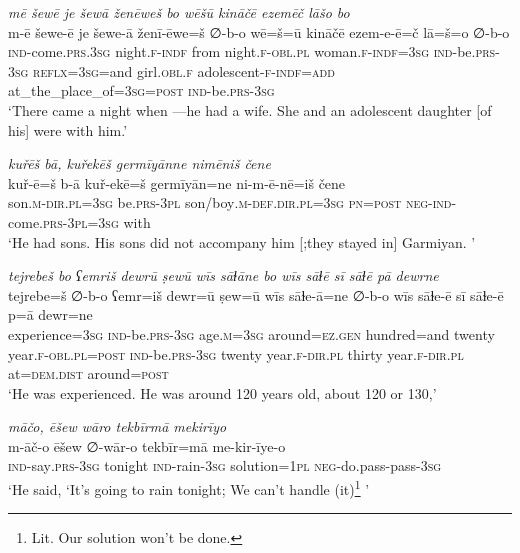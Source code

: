 \ea \label{ZB.8}
\textit{mē šewē je šewā ženēweš bo wēšū kināčē ezemēč lāšo bo} \\ 
\gll m-ē šewe-ē je šewe-ā ženī-ēwe=š ∅-b-o wē=š=ū kināčē ezem-e-ē=č lā=š=o ∅-b-o \\ 
 \textsc{ind-}come\textsc{.prs}\textsc{.3sg} night\textsc{.f}\textsc{-indf} from night\textsc{.f}\textsc{-obl}\textsc{.pl} woman\textsc{.f}\textsc{-indf}\textsc{=3sg} \textsc{ind-}be\textsc{.prs}\textsc{-3sg} \textsc{reflx}\textsc{=3sg}=and girl\textsc{.obl}\textsc{.f} adolescent\textsc{-f}\textsc{-indf}\textsc{=add} at\_the\_place\_of\textsc{=3sg}\textsc{=\textsc{post}} \textsc{ind-}be\textsc{.prs}\textsc{-3sg} \\ 
\glt `There came a night when —he had a wife. She and an adolescent daughter [of his] were with him.'
\z 
 
\ea \label{ZB.9}
\textit{kuřēš bā, kuřekēš germīyānne nimēniš čene} \\ 
\gll kuř-ē=š b-ā kuř-ekē=š germīyān=ne ni-m-ē-nē=iš čene \\ 
 son\textsc{.m}\textsc{-dir}\textsc{.pl}\textsc{=3sg} be\textsc{.prs}\textsc{-3pl} son/boy\textsc{.m}\textsc{-def}\textsc{.dir}\textsc{.pl}\textsc{=3sg} \textsc{pn}\textsc{=\textsc{post}} \textsc{neg-}\textsc{ind-}come\textsc{.prs}\textsc{-3pl}\textsc{=3sg} with \\ 
\glt `He had sons. His sons did not accompany him [;they stayed in] Garmiyan. '
\z 
 
\ea \label{ZB.12}
\textit{tejrebeš bo ʕemriš dewrū ṣewū wīs sāɫāne bo wīs sāɫē sī sāɫē pā dewrne} \\ 
\gll tejrebe=š ∅-b-o ʕemr=iš dewr=ū ṣew=ū wīs sāɫe-ā=ne ∅-b-o wīs sāɫe-ē sī sāɫe-ē p=ā dewr=ne \\ 
 experience\textsc{=3sg} \textsc{ind-}be\textsc{.prs}\textsc{-3sg} age\textsc{.m}\textsc{=3sg} around\textsc{\textsc{=ez.gen}} hundred=and twenty year\textsc{.f}\textsc{-obl}\textsc{.pl}\textsc{=\textsc{post}} \textsc{ind-}be\textsc{.prs}\textsc{-3sg} twenty year\textsc{.f}\textsc{-dir}\textsc{.pl} thirty year\textsc{.f}\textsc{-dir}\textsc{.pl} at=\textsc{dem.dist} around\textsc{=\textsc{post}} \\ 
\glt `He was experienced. He was around 120 years old, about 120 or 130,'
\z 
 
\ea \label{ZB.15}
\textit{māčo, ēšew wāro tekbīrmā mekirīyo} \\ 
\gll m-āč-o ēšew ∅-wār-o tekbīr=mā me-kir-īye-o \\ 
 \textsc{ind-}say\textsc{.prs}\textsc{-3sg} tonight \textsc{ind-}rain\textsc{-3sg} solution\textsc{=1pl} \textsc{neg-}do.pass-pass\textsc{-3sg} \\ 
\glt `He said, ‘It’s going to rain tonight; We can’t handle (it)\footnote{Lit. Our solution won’t be done.} '
\z 
 
